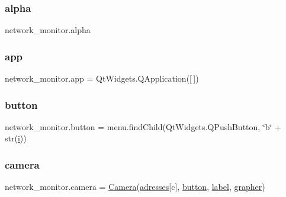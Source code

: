 \subsubsection{\texorpdfstring{alpha}{alpha}}
{\footnotesize\ttfamily network\+\_\+monitor.\+alpha}

\mbox{\label{namespacenetwork__monitor_adbe4adbd468aaae0ca471744f30fa1f6}} 
\subsubsection{\texorpdfstring{app}{app}}
{\footnotesize\ttfamily network\+\_\+monitor.\+app = Qt\+Widgets.\+Q\+Application(\mbox{[}$\,$\mbox{]})}

\mbox{\label{namespacenetwork__monitor_a068b20f337cc6bb4d8f773203ba1eb72}} 
\subsubsection{\texorpdfstring{button}{button}}
{\footnotesize\ttfamily network\+\_\+monitor.\+button = menu.\+find\+Child(Qt\+Widgets.\+Q\+Push\+Button, \char`\"{}b\char`\"{} + str(\hyperlink{namespacenetwork__monitor_acbaeef9dd38caeac7bfb4ce5cc555a68}{i}))}

\mbox{\label{namespacenetwork__monitor_a1642786c603ba143d757e407619d4a18}} 
\subsubsection{\texorpdfstring{camera}{camera}}
{\footnotesize\ttfamily network\+\_\+monitor.\+camera = \hyperlink{classnetwork__monitor_1_1_camera}{Camera}(\hyperlink{namespacenetwork__monitor_a58f207986e588fcaab74394ee1cf1bcb}{adresses}\mbox{[}c\mbox{]}, \hyperlink{namespacenetwork__monitor_a068b20f337cc6bb4d8f773203ba1eb72}{button}, \hyperlink{namespacenetwork__monitor_a581e75b195d137edaf37a10c8f54f10b}{label}, \hyperlink{namespacenetwork__monitor_a6caf9d5fe8492a62de30cc09eb3d6ee0}{grapher})}

